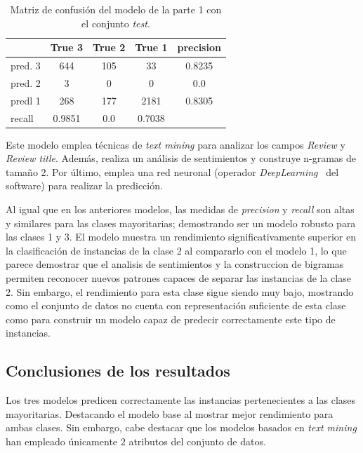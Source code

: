 \documentclass[es]{uc3mreport}
\begin{document}
\begin{report}
\begin{table}
\begin{tabular}{@{}lccc|c@{}}
    \toprule
             & True 3 & True 2 & True 1 & precision\\
    \midrule
    pred. 3  & 644 & 105       & 33     & 0.8235   \\
    pred. 2  & 3   & 0         & 0      & 0.0      \\
    predl 1  & 268 & 177       & 2181   & 0.8305   \\
    \midrule
    recall   & 0.9851 & 0.0 & 0.7038 &          \\
    \bottomrule
\end{tabular}
\caption{Matriz de confusión del modelo de la parte 1 con el conjunto \textit{test}.}
\end{table}

Este modelo emplea técnicas de \textit{text mining} para analizar los campos
\textit{Review} y \textit{Review title}. Además, realiza un análisis de
sentimientos y construye n-gramas de tamaño 2. Por último, emplea una red neuronal (operador
\textit{DeepLearning}~\cite{deeplearning} del software) para realizar la
predicción.

Al igual que en los anteriores modelos, las medidas de \textit{precision} y
\textit{recall} son altas y similares para las clases mayoritarias; demostrando
ser un modelo robusto para las clases 1 y 3. El modelo muestra un
rendimiento significativamente superior en la clasificación de instancias de la clase
2 al compararlo con el modelo 1, lo que parece demostrar que el analisis de
sentimientos y la construccion de bigramas permiten reconocer nuevos patrones
capaces de separar las instancias de la clase 2. Sin embargo, el rendimiento
para esta clase sigue siendo muy bajo, mostrando como el conjunto de datos no
cuenta con representación suficiente de esta clase como para construir un modelo capaz de
predecir correctamente este tipo de instancias.

\subsection{Conclusiones de los resultados}
\label{subsec:comparar_conclusiones}

Los tres modelos predicen correctamente las instancias pertenecientes a las
clases mayoritarias. Destacando el modelo base al mostrar mejor rendimiento para
ambas clases. Sin embargo, cabe destacar que los modelos basados en
\textit{text mining} han empleado únicamente 2 atributos del conjunto de datos.


\end{report}
\end{document}
